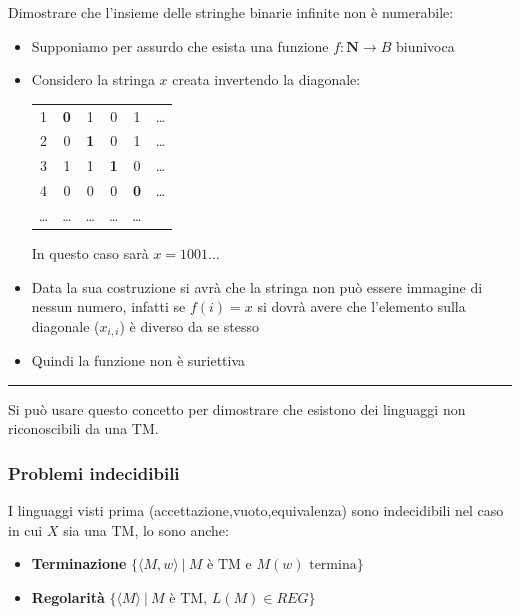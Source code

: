 \documentclass{article}
\begin{document}
\noindent Dimostrare che l'insieme delle stringhe binarie infinite non è numerabile:
\begin{itemize}
    \item Supponiamo per assurdo che esista una funzione $f:\mathbf{N}\rightarrow B$ biunivoca
    \item Considero la stringa $x$ creata invertendo la diagonale:
    
    \begin{table}[ht]
        \centering
        \begin{tabular}{c|ccccc}
            1 & \textbf{0} & 1 & 0 & 1 & \ldots\\
            2 & 0 & \textbf{1} & 0 & 1 & \ldots\\
            3 & 1 & 1 & \textbf{1} & 0 & \ldots\\
            4 & 0 & 0 & 0 & \textbf{0} & \ldots\\
            \ldots & \ldots & \ldots & \ldots & \ldots\\
        \end{tabular}
        \label{tab:cantor}
    \end{table}
    \qquad\qquad\qquad\qquad\quad In questo caso sarà $x=1001\ldots$

    \item Data la sua costruzione si avrà che la stringa non può essere immagine di nessun numero, infatti se $f(i)=x$ si dovrà avere che l'elemento sulla diagonale ($x_{i,i}$) è diverso da se stesso

    \item Quindi la funzione non è suriettiva
    
\end{itemize}

\noindent\rule{\textwidth}{0.5pt}\newline

\noindent Si può usare questo concetto per dimostrare che esistono dei linguaggi non riconoscibili da una TM.\newline

\subsubsection{Problemi indecidibili
}

I linguaggi visti prima (accettazione,vuoto,equivalenza) sono indecidibili nel caso in cui $X$ sia una TM, lo sono anche:\newline
\begin{itemize}
    \item \textbf{Terminazione} $\{\langle M,w\rangle\ |\ M \text{ è TM e } M(w) \text{ termina}\}$
    \item \textbf{Regolarità} $\{\langle M\rangle\ |\ M \text{ è TM, } L(M) \in REG\}$
\end{itemize}
\end{document}
